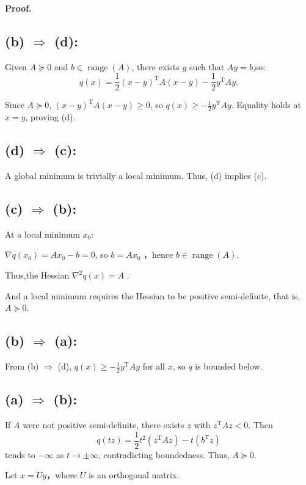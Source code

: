 \documentclass[a4paper, 11pt]{article}
\newenvironment{solution}
    {\textbf{Proof.}}
    {}
\begin{document}
\begin{solution}
	\subsection*{(b) $\Rightarrow$ (d):}
	Given \( A \succeq 0 \) and \( b \in \operatorname{range}(A) \), there exists \( y \) such that \( Ay = b \),so:
$$
	q(x) = \frac{1}{2}(x - y)^{\mathrm{T}} A (x - y) - \frac{1}{2} y^{\mathrm{T}} A y.
$$
	
	Since \( A \succeq 0 \), \( (x - y)^{\mathrm{T}} A (x - y) \geq 0 \), so \( q(x) \geq -\frac{1}{2} y^{\mathrm{T}} A y \). Equality holds at \( x = y \), proving (d).
	\subsection*{(d) $\Rightarrow$ (c): }
	
	A global minimum is trivially a local minimum. Thus, (d) implies (c).
	\subsection*{(c) $\Rightarrow$ (b): }
	
	At a local minimum \( x_0 \):
	
\( \nabla q(x_0) = Ax_0 - b = 0 \), so \( b = Ax_0 \) ，hence \( b \in \operatorname{range}(A) \).  
	
Thus,the Hessian \( \nabla^2 q(x) = A \) .
	
And a local minimum requires the Hessian to be positive semi-definite, that is, \(A \succeq 0\).  
	\subsection*{(b) $\Rightarrow$ (a): }
	
	From (b) $\Rightarrow$ (d), \( q(x) \geq -\frac{1}{2} y^{\mathrm{T}} A y \) for all \( x \), so \( q \) is bounded below.
	\subsection*{(a) $\Rightarrow$ (b):}
	
If \( A \) were not positive semi-definite, there exists \( z \) with \( z^{\mathrm{T}}Az < 0 \). Then 
$$
q(tz) = \frac{1}{2}t^2 (z^{\mathrm{T}}Az) - t(b^{\mathrm{T}}z)
$$
tends to \( -\infty \) as \( t \to \pm\infty \), contradicting boundedness. Thus, \( A \succeq 0 \).

Let \( x = Uy \)，where \( U \) is an orthogonal matrix. 


\end{solution}
\end{document}
